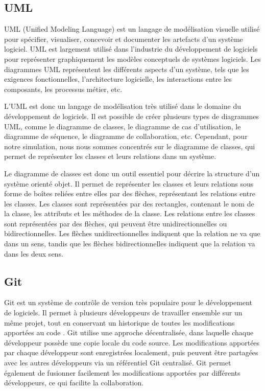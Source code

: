 
\subsection{UML}

UML (Unified Modeling Language) est un langage de modélisation visuelle utilisé pour spécifier, visualiser, concevoir et documenter les artefacts d'un système logiciel.\parencite{omg-uml} UML est largement utilisé dans l'industrie du développement de logiciels pour représenter graphiquement les modèles conceptuels de systèmes logiciels. Les diagrammes UML représentent les différents aspects d'un système, tels que les exigences fonctionnelles, l'architecture logicielle, les interactions entre les composants, les processus métier, etc.

L'UML est donc un langage de modélisation très utilisé dans le domaine du développement de logiciels. Il est possible de créer plusieurs types de diagrammes UML, comme le diagramme de classes, le diagramme de cas d'utilisation, le diagramme de séquence, le diagramme de collaboration, etc. Cependant, pour notre simulation, nous nous sommes concentrés sur le diagramme de classes, qui permet de représenter les classes et leurs relations dans un système.

Le diagramme de classes est donc un outil essentiel pour décrire la structure d'un système orienté objet. Il permet de représenter les classes et leurs relations sous forme de boîtes reliées entre elles par des flèches, représentant les relations entre les classes. Les classes sont représentées par des rectangles, contenant le nom de la classe, les attributs et les méthodes de la classe. Les relations entre les classes sont représentées par des flèches, qui peuvent être unidirectionnelles ou bidirectionnelles. Les flèches unidirectionnelles indiquent que la relation ne va que dans un sens, tandis que les flèches bidirectionnelles indiquent que la relation va dans les deux sens.


\subsection{Git}

Git est un système de contrôle de version très populaire pour le développement de logiciels. Il permet à plusieurs développeurs de travailler ensemble sur un même projet, tout en conservant un historique de toutes les modifications apportées au code \parencite{chacon2014pro}. Git utilise une approche décentralisée, dans laquelle chaque développeur possède une copie locale du code source. Les modifications apportées par chaque développeur sont enregistrées localement, puis peuvent être partagées avec les autres développeurs via un référentiel Git centralisé. Git permet également de fusionner facilement les modifications apportées par différents développeurs, ce qui facilite la collaboration.

